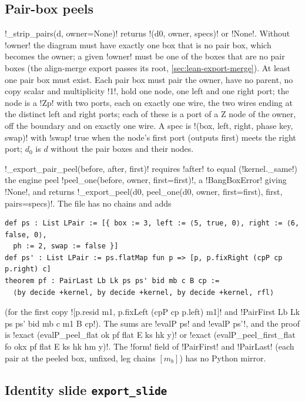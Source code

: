 {{{\subsection{Pair-box peels}\label{sec:lean-export-pair}

\lexpy!_strip_pairs(d, owner=None)! returns \lexcode!(d0, owner, specs)! or \lexpy!None!. Without
\lexpy!owner! the diagram must have exactly one box that is no pair box, which becomes the owner; a
given \lexpy!owner! must be one of the boxes that are no pair boxes (the align-merge export passes
its root, \cref{sec:lean-export-merge}). At least one pair box must exist. Each pair box must
pair the owner, have no parent, no copy scalar and multiplicity \lexcode!1!, hold one node, one left
and one right port; the node is a \lexcode!Zp! with two ports, each on exactly one wire, the two
wires ending at the distinct left and right ports; each of these is a port of a Z node of the
owner, off the boundary and on exactly one wire. A spec is
\lexcode!(box, left, right, phase key, swap)! with \lexcode!swap! true when the node's first port
(outputs first) meets the right port; $d_0$ is $d$ without the pair boxes and their nodes.

\lexpy!_export_pair_peel(before, after, first)! requires \lexcode!after! to equal
(\lexpy!kernel._same!) the engine peel \lexpy!peel_one(before, owner, first=first)!, a
\lexpy!BangBoxError! giving \lexpy!None!, and returns
\lexpy!_export_peel(d0, peel_one(d0, owner, first=first), first, pairs=specs)!. The file has no
chains and adds
\begin{lstlisting}[style=lexlean]
def ps : List LPair := [{ box := 3, left := ⟨5, true, 0⟩, right := ⟨6, false, 0⟩,
  ph := 2, swap := false }]
def ps' : List LPair := ps.flatMap fun p => [p, p.fixRight (cpP cp p.right) c]
theorem pf : PairLast Lb Lk ps ps' bid mb c B cp :=
  ⟨by decide +kernel, by decide +kernel, by decide +kernel, rfl⟩
\end{lstlisting}
(for the first copy \lexlean![p.resid m1, p.fixLeft (cpP cp p.left) m1]! and
\lexlean!PairFirst Lb Lk ps ps' bid mb c m1 B cp!). The sums are \lexlean!evalP ps! and
\lexlean!evalP ps'!, and the proof is \lexlean!exact (evalP_peel_flat ok pf flat E ks hk y)! or
\lexlean!exact (evalP_peel_first_flat fo okx pf flat E ks hk hm y)!. The \lexlean!form! field of
\lexlean!PairFirst! and \lexlean!PairLast! (each pair at the peeled box, unfixed, leg chains $[m_b]$)
has no Python mirror.

\subsection{Identity slide \texttt{export\_slide}}

}}}
